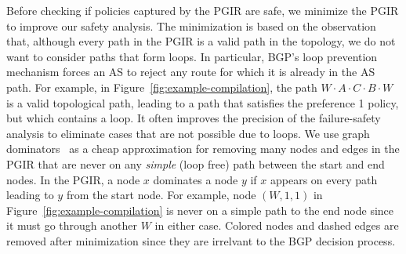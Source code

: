 Before checking if policies captured by the PGIR are safe, we minimize the PGIR to improve our safety analysis. 
The minimization is based on the observation that, although every path in the PGIR is a valid path in the topology, we do not want to consider paths that form loops. In particular, BGP's loop prevention mechanism forces an AS to reject any route for which it is already in the AS path.
%
For example, in Figure~\ref{fig:example-compilation}, the path $W \cdot A \cdot C \cdot B \cdot W$ is a valid topological path, leading to a path that satisfies the preference 1 policy, but which contains a loop.
%
It often improves the precision of the failure-safety analysis to eliminate cases that are not possible due to loops. 
We use graph dominators~\cite{tarjan-dominance} as a cheap approximation for removing many nodes and edges in the PGIR that are never on any \emph{simple} (loop free) path between the start and end nodes.
In the PGIR, a node $x$ dominates a node $y$ if $x$ appears on every path leading to $y$ from the start node.
For example, node $(W,1,1)$ in Figure~\ref{fig:example-compilation} is never on a simple path to the end node since it must go through another $W$ in either case.
Colored nodes and dashed edges are removed after minimization since they are irrelvant to the BGP decision process.
%

%
%


